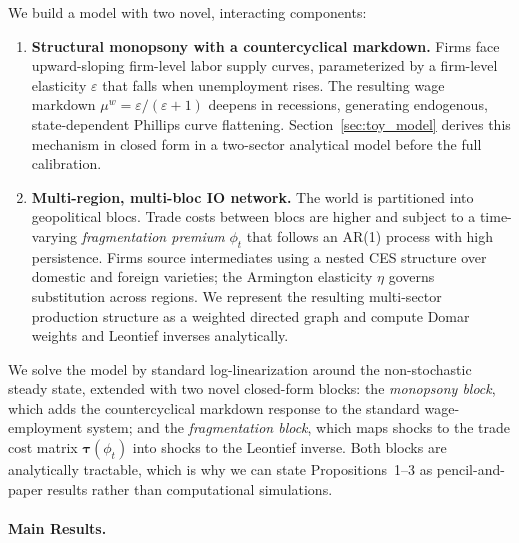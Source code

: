 We build a model with two novel, interacting components:

\begin{enumerate}
\item \textbf{Structural monopsony with a countercyclical markdown.}
  Firms face upward-sloping firm-level labor supply curves, parameterized by
  a firm-level elasticity $\varepsilon$ that falls when unemployment rises.
  The resulting wage markdown $\mu^w = \varepsilon/(\varepsilon+1)$ deepens in
  recessions, generating endogenous, state-dependent Phillips curve flattening.
  Section~\ref{sec:toy_model} derives this mechanism in closed form in a
  two-sector analytical model before the full calibration.

\item \textbf{Multi-region, multi-bloc IO network.}
  The world is partitioned into geopolitical blocs. Trade costs between blocs
  are higher and subject to a time-varying \emph{fragmentation premium} $\phi_t$
  that follows an AR(1) process with high persistence. Firms source intermediates
  using a nested CES structure over domestic and foreign varieties; the
  Armington elasticity $\eta$ governs substitution across regions. We represent
  the resulting multi-sector production structure as a weighted directed graph
  and compute Domar weights and Leontief inverses analytically.
\end{enumerate}

We solve the model by standard log-linearization around the non-stochastic
steady state, extended with two novel closed-form blocks: the
\emph{monopsony block}, which adds the countercyclical markdown response
to the standard wage-employment system; and the \emph{fragmentation block},
which maps shocks to the trade cost matrix $\boldsymbol{\tau}(\phi_t)$ into
shocks to the Leontief inverse. Both blocks are analytically tractable, which
is why we can state Propositions~1--3 as pencil-and-paper results rather than
computational simulations.

\paragraph{Main Results.}

